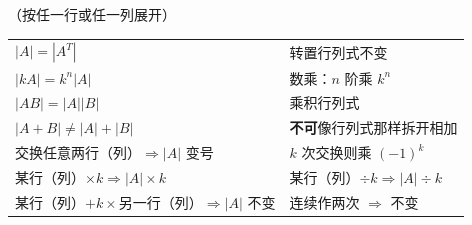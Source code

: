 
\begin{secbox}

\begin{formbox}
\hfill（按任一行或任一列展开）

\hfill{}
\end{formbox}

\begin{formbox}
\renewcommand{\arraystretch}{1.5}
\begin{tabular}{@{}p{7.4cm}p{8.6cm}@{}}
$|A|=|A^{T}|$
  & 转置行列式不变 \\[4pt]
$|kA|=k^{n}|A|$
  & 数乘：$n$ 阶乘 $k^{n}$ \\[4pt]
$|AB|=|A||B|$
  & 乘积行列式 \\[4pt]
$|A+B|\ne|A|+|B|$
  & \textbf{不可}像行列式那样拆开相加 \\[4pt]
交换任意两行（列）$\Rightarrow|A|$ 变号
  & $k$ 次交换则乘 $(-1)^{k}$ \\[4pt]
某行（列）$\times k\Rightarrow|A|\times k$
  & 某行（列）$\div k\Rightarrow|A|\div k$ \\[4pt]
某行（列）$+k\times$另一行（列）$\Rightarrow|A|$ 不变
  & 连续作两次 $\Rightarrow$ 不变
\end{tabular}
\end{formbox}


\end{secbox}
